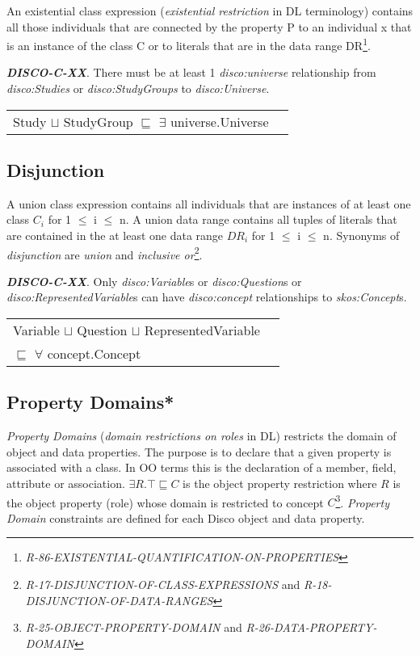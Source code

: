 \documentclass{elsart3p}    %
\newenvironment{DL}{
  \vspace{0cm}
  \begin{tabular}{l l}

}{
  \end{tabular}
}
\begin{document}
An existential class expression ({\em existential restriction} in DL terminology) contains all those individuals that are connected by the property P to an individual x that is an instance of the class C or to literals that are in the data range DR\footnote{{\em R-86-EXISTENTIAL-QUANTIFICATION-ON-PROPERTIES}}.

\textbf{{\em DISCO-C-XX}}. 
There must be at least 1 {\em disco:universe} relationship from {\em disco:Studies} or {\em disco:StudyGroups} to {\em disco:Universe}.

\begin{DL}
Study $\sqcup$ StudyGroup $\sqsubseteq$ $\exists$ universe.Universe \\
\end{DL}

\subsection{Disjunction}

A union class expression contains all individuals that are instances of at least one class $C_{i}$ for 1 $\leq$ i $\leq$ n. 
A union data range contains all tuples of literals that are contained in the at least one data range $DR_{i}$ for 1 $\leq$ i $\leq$ n.
Synonyms of {\em disjunction} are {\em union} and {\em inclusive or}\footnote{{\em R-17-DISJUNCTION-OF-CLASS-EXPRESSIONS} and {\em R-18-DISJUNCTION-OF-DATA-RANGES}}.

\textbf{{\em DISCO-C-XX}}. 
Only {\em disco:Variable}s or {\em disco:Question}s or {\em disco:RepresentedVariable}s can have {\em disco:concept} relationships to {\em skos:Concept}s.

\begin{DL}
Variable $\sqcup$ Question $\sqcup$ RepresentedVariable \\
$\sqsubseteq$ $\forall$ concept.Concept \\
\end{DL}
		
\subsection{Property Domains*}

{\em Property Domains} ({\em domain restrictions on roles} in DL) restricts the domain of object and data properties.
The purpose is to declare that a given property is associated with a class. 
In OO terms this is the declaration of a member, field, attribute or association. 
$\exists R. \top \sqsubseteq C$ is the object property restriction where $R$ is the object property (role) whose domain is restricted to concept $C$\footnote{{\em R-25-OBJECT-PROPERTY-DOMAIN} and {\em R-26-DATA-PROPERTY-DOMAIN}}.
{\em Property Domain} constraints are defined for each Disco object and data property.
\end{document}
